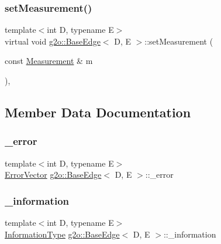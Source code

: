 \subsubsection{\texorpdfstring{set\+Measurement()}{setMeasurement()}}
{\footnotesize\ttfamily template$<$int D, typename E$>$ \\
virtual void \mbox{\hyperlink{classg2o_1_1_base_edge}{g2o\+::\+Base\+Edge}}$<$ D, E $>$\+::set\+Measurement (\begin{DoxyParamCaption}\item[{const \mbox{\hyperlink{classg2o_1_1_base_edge_a2c148abba650a20b8c7eed75d3e2211e}{Measurement}} \&}]{m }\end{DoxyParamCaption})\hspace{0.3cm}{\ttfamily [inline]}, {\ttfamily [virtual]}}



\subsection{Member Data Documentation}
\mbox{\label{classg2o_1_1_base_edge_af31f4b0a67bb12b4de4a32dc42467836}} 
\subsubsection{\texorpdfstring{\+\_\+error}{\_error}}
{\footnotesize\ttfamily template$<$int D, typename E$>$ \\
\mbox{\hyperlink{classg2o_1_1_base_edge_af5b558dd24e4be2e437563cae4b3550d}{Error\+Vector}} \mbox{\hyperlink{classg2o_1_1_base_edge}{g2o\+::\+Base\+Edge}}$<$ D, E $>$\+::\+\_\+error\hspace{0.3cm}{\ttfamily [protected]}}

\mbox{\label{classg2o_1_1_base_edge_a49f11e3d1eaa8e666e1d4d3607279377}} 
\subsubsection{\texorpdfstring{\+\_\+information}{\_information}}
{\footnotesize\ttfamily template$<$int D, typename E$>$ \\
\mbox{\hyperlink{classg2o_1_1_base_edge_a2e5a33343ac3f189d8a7d5ee4d8b73fc}{Information\+Type}} \mbox{\hyperlink{classg2o_1_1_base_edge}{g2o\+::\+Base\+Edge}}$<$ D, E $>$\+::\+\_\+information\hspace{0.3cm}{\ttfamily [protected]}}

